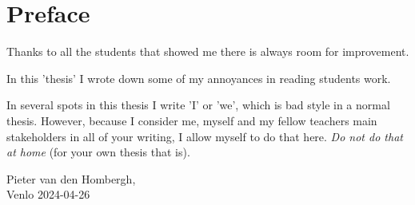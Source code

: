 \chapter*{Preface}

Thanks to all the students that showed me there is always room for improvement.

In this 'thesis' I wrote down some of my annoyances in reading students work.

In several spots in this thesis I write 'I' or 'we', which is bad style in a normal thesis.
However, because I consider me, myself and my fellow teachers main stakeholders in all of your writing, I allow myself to do that here. \textit{Do not do that at home} (for your own thesis that is).

Pieter van den Hombergh,\\
Venlo 2024-04-26
